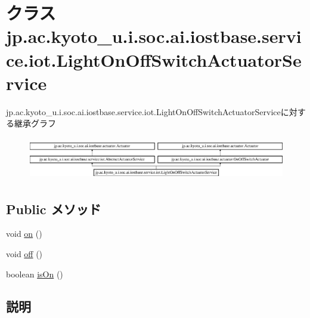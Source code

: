 \hypertarget{classjp_1_1ac_1_1kyoto__u_1_1i_1_1soc_1_1ai_1_1iostbase_1_1service_1_1iot_1_1_light_on_off_switch_actuator_service}{\section{クラス jp.\-ac.\-kyoto\-\_\-u.\-i.\-soc.\-ai.\-iostbase.\-service.\-iot.\-Light\-On\-Off\-Switch\-Actuator\-Service}
\label{classjp_1_1ac_1_1kyoto__u_1_1i_1_1soc_1_1ai_1_1iostbase_1_1service_1_1iot_1_1_light_on_off_switch_actuator_service}
}
jp.\-ac.\-kyoto\-\_\-u.\-i.\-soc.\-ai.\-iostbase.\-service.\-iot.\-Light\-On\-Off\-Switch\-Actuator\-Serviceに対する継承グラフ\begin{figure}[H]
\begin{center}
\leavevmode
\includegraphics[height=1.870824cm]{classjp_1_1ac_1_1kyoto__u_1_1i_1_1soc_1_1ai_1_1iostbase_1_1service_1_1iot_1_1_light_on_off_switch_actuator_service}
\end{center}
\end{figure}
\subsection*{Public メソッド}
\begin{DoxyCompactItemize}
\item 
void \hyperlink{classjp_1_1ac_1_1kyoto__u_1_1i_1_1soc_1_1ai_1_1iostbase_1_1service_1_1iot_1_1_light_on_off_switch_actuator_service_a47891d0ae2dc3da1ca0a0568db112fa9}{on} ()
\item 
void \hyperlink{classjp_1_1ac_1_1kyoto__u_1_1i_1_1soc_1_1ai_1_1iostbase_1_1service_1_1iot_1_1_light_on_off_switch_actuator_service_a773343c115b928117cc0500984d10c85}{off} ()
\item 
boolean \hyperlink{classjp_1_1ac_1_1kyoto__u_1_1i_1_1soc_1_1ai_1_1iostbase_1_1service_1_1iot_1_1_light_on_off_switch_actuator_service_a42a989bb8595955c946301f40ce03622}{is\-On} ()
\end{DoxyCompactItemize}


\subsection{説明}


